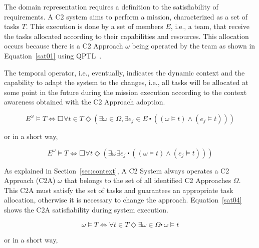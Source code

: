 The domain representation requires a definition to the satisfiability of requirements. A C2 system aims to perform a mission, characterized as a set of tasks $T$. This execution is done by a set of members $E$, i.e., a team, that receive the tasks allocated according to their capabilities and resources. This allocation occurs because there is a C2 Approach $\omega$ being operated by the team as shown in Equation~\ref{sat01} using QPTL~\cite{qptl01}.

The temporal operator, i.e., eventually, indicates the dynamic context and the capability to adapt the system to the changes, i.e., all tasks will be allocated at some point in the future during the mission execution according to the context awareness obtained with the C2 Approach adoption.

\begin{center}
\begin{equation}
\label{sat01}
E^\omega \models T \Longleftrightarrow \Square \forall t \in T \Diamond (\exists \omega \in \Omega, \exists e_j \in E \ \centerdot \ ((\omega \models t) \land (e_j \models t)))
\end{equation}
\end{center}

or in a short way,

\begin{center}
\begin{equation}
\label{}
E^\omega \models T \Longleftrightarrow \Square \forall t \Diamond (\exists \omega \exists e_j \ \centerdot \ ((\omega \models t) \land (e_j \models t)))
\end{equation}
\end{center}

As explained in Section~\ref{sec:context}, A C2 System always operates a C2 Approach (C2A) $\omega$ that belongs to the set of all identified C2 Approaches $\Omega$. This C2A must satisfy the set of tasks and guarantees an appropriate task allocation, otherwise it is necessary to change the approach. Equation~\ref{sat04} shows the C2A satisfiability during system execution.

\begin{center}
\begin{equation}
\label{sat04}
\omega \models T \Longleftrightarrow \forall t \in T \Diamond \exists \omega \in \Omega \centerdot \ \omega \models t 
\end{equation}
\end{center}

or in a short way,

